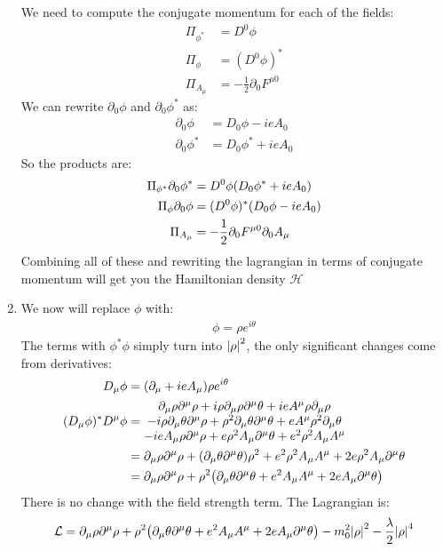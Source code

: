 \documentclass[12pt]{article}
\renewcommand{\L}{\mathcal{L}}
\renewcommand{\H}{\mathcal{H}}
\newcommand{\D}{\partial}
\begin{document}
\begin{enumerate}
  We need to compute the conjugate momentum for each of the fields:
  \begin{align*}
    \Pi_{\phi^*}&=D^0\phi\\
    \Pi_\phi&=(D^0\phi)^*\\
    \Pi_{A_\mu}&=-\frac{1}{2}\D_0F^{\mu0}
  \end{align*}
  We can rewrite $\D_0\phi$ and $\D_0\phi^*$ as:
  \begin{align*}
    \D_0\phi&=D_0\phi-ieA_0\\
    \D_0\phi^*&=D_0\phi^*+ieA_0
  \end{align*}
  So the products are:
  \begin{align*}
    \Pi_{\phi^*}\D_0\phi^*&=D^0\phi\qty(D_0\phi^*+ieA_0)\\
    \Pi_{\phi}\D_0\phi&=(D^0\phi)^*\qty(D_0\phi-ieA_0)\\
    \Pi_{A_\mu}&=-\frac{1}{2}\D_0F^{\mu0}\D_0A_\mu
  \end{align*}
  Combining all of these and rewriting the lagrangian in terms of conjugate momentum will get you the Hamiltonian density $\H$
\item We now will replace $\phi$ with:
  \begin{align*}
    \phi=\rho e^{i\theta}
  \end{align*}
  The terms with $\phi^*\phi$ simply turn into $\abs{\rho}^2$, the only significant changes come from derivatives:
  \begin{align*}
    D_\mu\phi&=\qty(\D_\mu+ieA_\mu)\rho e^{i\theta}\\
    (D_\mu\phi)^*D^\mu\phi&=
    \mqty{\D_\mu\rho\D^\mu\rho+i\rho\D_\mu\rho\D^\mu\theta+ieA^\mu\rho\D_\mu\rho\\
      -i\rho\D_\mu\theta\D^\mu\rho+\rho^2\D_\mu\theta\D^\mu\theta+
      eA^\mu\rho^2\D_\mu\theta\\-ieA_\mu\rho\D^\mu\rho+e\rho^2A_\mu\D^\mu\theta+
      e^2\rho^2A_\mu A^\mu}\\
    &=\D_\mu\rho\D^\mu\rho+(\D_\mu\theta\D^\mu\theta)\rho^2+e^2\rho^2A_\mu A^\mu
    +2e\rho^2A_\mu\D^\mu\theta\\
    &=\D_\mu\rho\D^\mu\rho+\rho^2\qty(\D_\mu\theta\D^\mu\theta+
    e^2A_\mu A^\mu+2eA_\mu\D^\mu\theta)
  \end{align*}
  There is no change with the field strength term. The Lagrangian is:
  \begin{align*}
    \L=\D_\mu\rho\D^\mu\rho+\rho^2\qty(\D_\mu\theta\D^\mu\theta+
    e^2A_\mu A^\mu+2eA_\mu\D^\mu\theta)
    -m_0^2\abs{\rho}^2-\frac{\lambda}{2}\abs{\rho}^4

\end{align*}
\end{enumerate}
\end{document}
